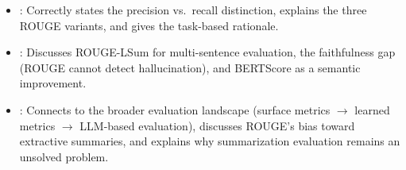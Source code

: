 \begin{interviewq}

\goodgreat
\begin{itemize}
    \item {}: Correctly states the precision vs.\ recall
          distinction, explains the three ROUGE variants, and gives the
          task-based rationale.
    \item {}: Discusses ROUGE-LSum for multi-sentence evaluation,
          the faithfulness gap (ROUGE cannot detect hallucination), and
          BERTScore as a semantic improvement.
    \item {}: Connects to the broader evaluation landscape
          (surface metrics $\to$ learned metrics $\to$ LLM-based evaluation),
          discusses ROUGE's bias toward extractive summaries, and explains
          why summarization evaluation remains an unsolved problem.
\end{itemize}

\end{interviewq}

\vspace{0.5em}

